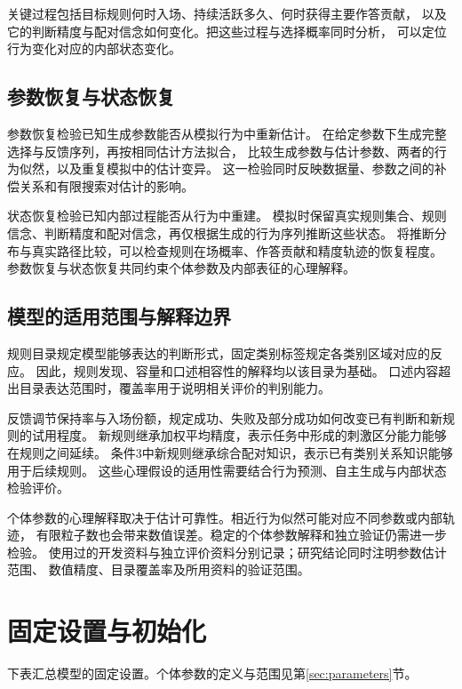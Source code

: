 \documentclass[11pt,a4paper]{article}
\numberwithin{equation}{section}
\begin{document}
关键过程包括目标规则何时入场、持续活跃多久、何时获得主要作答贡献，
以及它的判断精度与配对信念如何变化。把这些过程与选择概率同时分析，
可以定位行为变化对应的内部状态变化。

\subsection{参数恢复与状态恢复}
参数恢复检验已知生成参数能否从模拟行为中重新估计。
在给定参数下生成完整选择与反馈序列，再按相同估计方法拟合，
比较生成参数与估计参数、两者的行为似然，以及重复模拟中的估计变异。
这一检验同时反映数据量、参数之间的补偿关系和有限搜索对估计的影响。

状态恢复检验已知内部过程能否从行为中重建。
模拟时保留真实规则集合、规则信念、判断精度和配对信念，再仅根据生成的行为序列推断这些状态。
将推断分布与真实路径比较，可以检查规则在场概率、作答贡献和精度轨迹的恢复程度。
参数恢复与状态恢复共同约束个体参数及内部表征的心理解释。

\subsection{模型的适用范围与解释边界}
规则目录规定模型能够表达的判断形式，固定类别标签规定各类别区域对应的反应。
因此，规则发现、容量和口述相容性的解释均以该目录为基础。
口述内容超出目录表达范围时，覆盖率用于说明相关评价的判别能力。

反馈调节保持率与入场份额，规定成功、失败及部分成功如何改变已有判断和新规则的试用程度。
新规则继承加权平均精度，表示任务中形成的刺激区分能力能够在规则之间延续。
条件3中新规则继承综合配对知识，表示已有类别关系知识能够用于后续规则。
这些心理假设的适用性需要结合行为预测、自主生成与内部状态检验评价。

个体参数的心理解释取决于估计可靠性。相近行为似然可能对应不同参数或内部轨迹，
有限粒子数也会带来数值误差。稳定的个体参数解释和独立验证仍需进一步检验。
使用过的开发资料与独立评价资料分别记录；研究结论同时注明参数估计范围、
数值精度、目录覆盖率及所用资料的验证范围。

\appendix
\section{固定设置与初始化}
\label{app:settings}

下表汇总模型的固定设置。个体参数的定义与范围见第\ref{sec:parameters}节。
\end{document}

